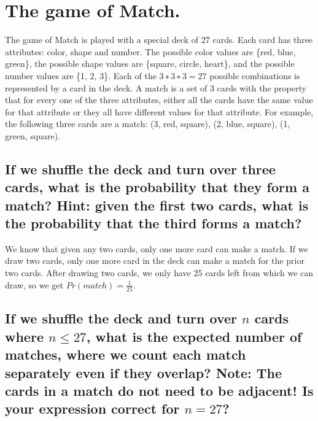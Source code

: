 \documentclass[titlepage]{article}\usepackage[]{graphicx}\usepackage[]{color}
\begin{document}














  \section{ The game of Match. }
  The game of Match is played with a special deck of 27 cards. Each card has
  three attributes: color, shape and number. The possible color values are
  \{red, blue, green\}, the possible shape values are \{square, circle, heart\},
  and the possible number values are \{1, 2, 3\}. Each of the $3 ∗ 3 ∗ 3 = 27$
  possible combinations is represented by a card in the deck. A match is a set
  of 3 cards with the property that for every one of the three attributes,
  either all the cards have the same value for that attribute or they all have
  different values for that attribute. For example, the following three cards
  are a match: (3, red, square), (2, blue, square), (1, green, square).


\subsection{ If we shuffle the deck and turn over three cards, what is the
probability that they form a match? Hint: given the first two
cards, what is the probability that the third forms a match?}

We know that given any two cards, only one more card can make a match. If we
draw two cards, only one more card in the deck can make a match for the prior
two cards. After drawing two cards, we only have 25 cards left from which we
can draw, so we get $Pr(match) = \frac{1}{25}$. 



\subsection{ If we shuffle the deck and turn over $n$ cards where $n \leq 27$, what
is the expected number of matches, where we count each match
separately even if they overlap? Note: The cards in a match do
not need to be adjacent! Is your expression correct for $n = 27$?}
\end{document}
